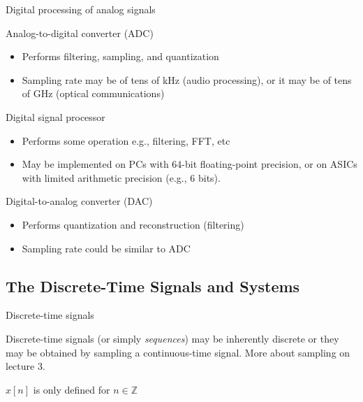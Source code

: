 \documentclass[10pt, handout]{beamer}
\begin{document}
%
\begin{frame}{Digital processing of analog signals}
\vspace{-0.5cm}
\begin{figure}[t!]
	\centering
	\resizebox{\linewidth}{!}{}
	\label{fig:adc-dsp-dac}
\end{figure}
\vspace{-0.5cm}
\begin{block}{Analog-to-digital converter (ADC)}
	\begin{itemize}
		\item Performs filtering, sampling, and quantization
		\item Sampling rate may be of tens of kHz (audio processing), or it may be of tens of GHz (optical communications)
	\end{itemize}
\end{block}
\vspace{-0.3cm}
\begin{block}{Digital signal processor}
	\begin{itemize} \itemsep 0pt
		\item Performs some operation e.g., filtering, FFT, etc
		\item May be implemented on PCs with 64-bit floating-point precision, or on ASICs with limited arithmetic precision (e.g., 6 bits).
	\end{itemize}
\end{block}
\vspace{-0.3cm}
\begin{block}{Digital-to-analog converter (DAC)}
	\begin{itemize}
		\item Performs quantization and reconstruction (filtering)
		\item Sampling rate could be similar to ADC
	\end{itemize}
\end{block}

\end{frame}

\subsection{The Discrete-Time Signals and Systems}
%
\begin{frame}{Discrete-time signals}

Discrete-time signals (or simply \textit{sequences}) may be inherently discrete or they may be obtained by sampling a continuous-time signal. More about sampling on lecture 3.

\begin{figure}[t!]
	\centering
	\resizebox{0.5\linewidth}{!}{}
	\label{fig:ct_signal_sampled}
\end{figure}

$x[n]$ is only defined for $n\in\mathbb{Z}$
\end{frame}
\end{document}

